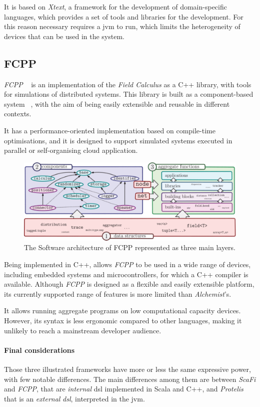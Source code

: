 It is based on \emph{Xtext}, a framework for the development of domain-specific languages, which provides a set of tools
and libraries for the development.
For this reason necessary requires a \ac{jvm} to run, which limits the heterogeneity of devices
that can be used in the system.

\subsection{FCPP}
\label{subsec:fcpp}
\emph{FCPP} ~\cite{9196401} is an implementation of the \emph{Field Calculus} as a C++ library, with tools for simulations of distributed systems.
This library is built as a component-based system ~, with the aim of being easily extensible and reusable in different contexts.

It has a performance-oriented implementation based on compile-time optimisations, and it is designed to support
simulated systems executed in parallel or self-organising cloud application.

\begin{figure}
    \centering
    \includegraphics[width=.8\linewidth]{figures/fcpp-structure}
    \caption{The Software architecture of FCPP represented as three main layers.}
    \label{fig:fcpp-structure}
\end{figure}

Being implemented in C++, allows \emph{FCPP} to be used in a wide range of devices, including embedded systems and
microcontrollers, for which a C++ compiler is available.
Although \emph{FCPP} is designed as a flexible and easily extensible platform, its currently supported range of features
is more limited than \emph{Alchemist}'s.

It allows running aggregate programs on low computational capacity devices.
However, its syntax is less ergonomic compared to other languages, making it unlikely to reach a mainstream developer audience.

\paragraph{Final considerations}
Those three illustrated frameworks have more or less the same expressive power, with few notable differences.
The main differences among them are between \emph{ScaFi} and \emph{FCPP}, that are \emph{internal} \ac{dsl} implemented in Scala
and C++, and \emph{Protelis} that is an \emph{external} \emph{dsl}, interpreted in the \ac{jvm}.

